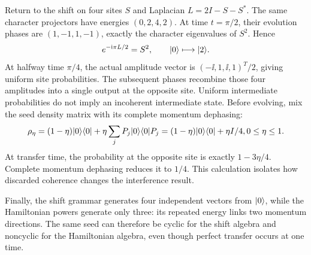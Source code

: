 Return to the shift on four sites $S$ and Laplacian $L=2I-S-S^*$. The same character projectors have energies $(0,2,4,2)$. At time $t=\pi/2$, their evolution phases are $(1,-1,1,-1)$, exactly the character eigenvalues of $S^2$. Hence
\[
e^{-\ii\pi L/2}=S^2,\qquad
\ket0\longmapsto\ket2.
\]
At halfway time $\pi/4$, the actual amplitude vector is $(-\ii,1,\ii,1)^T/2$, giving uniform site probabilities. The subsequent phases recombine those four amplitudes into a single output at the opposite site. Uniform intermediate probabilities do not imply an incoherent intermediate state.
Before evolving, mix the seed density matrix with its complete momentum dephasing:
\[
\rho_\eta=(1-\eta)\lvert 0\rangle\langle 0\rvert+\eta\sum_jP_j\lvert 0\rangle\langle 0\rvert P_j
=(1-\eta)\lvert 0\rangle\langle 0\rvert+\eta I/4,
0\le\eta\le1.
\]
At transfer time, the probability at the opposite site is exactly $1-3\eta/4$. Complete momentum dephasing reduces it to $1/4$. This calculation isolates how discarded coherence changes the interference result.

Finally, the shift grammar generates four independent vectors from $\lvert 0\rangle$, while the Hamiltonian powers generate only three: its repeated energy links two momentum directions. The same seed can therefore be cyclic for the shift algebra and noncyclic for the Hamiltonian algebra, even though perfect transfer occurs at one time.

